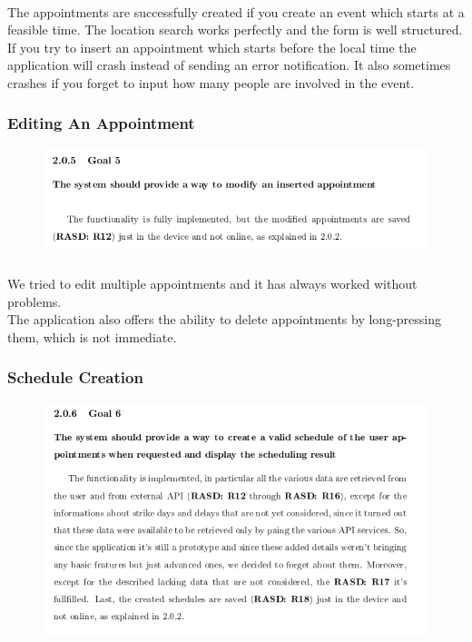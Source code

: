 \documentclass{article}
\begin{document}
			\paragraph{}The appointments are successfully created if you create an event which starts at a feasible time. The location search works perfectly and the form is well structured. If you try to insert an appointment which starts before the local time the application will crash instead of sending an error notification. It also sometimes crashes if you forget to input how many people are involved in the event.
			\subsubsection{Editing An Appointment}
			\begin{figure}[H]
			\includegraphics[width=\linewidth]{Images/Goals/Goal_5.png}
			\label{fig:G5}
			\end{figure}
			\paragraph{}We tried to edit multiple appointments and it has always worked without problems. \\The application also offers the ability to delete appointments by long-pressing them, which is not immediate.
			\subsubsection{Schedule Creation}
			\begin{figure}[H]
			\includegraphics[width=\linewidth]{Images/Goals/Goal_6.png}
			\label{fig:G6}
			\end{figure}
\end{document}

